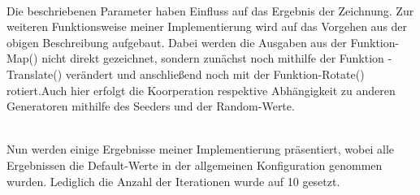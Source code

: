 \documentclass[../mciAusarbeitung.tex]{subfiles}
\begin{document}
            $~$ \\Die beschriebenen Parameter haben Einfluss auf das Ergebnis der Zeichnung. Zur weiteren Funktionsweise meiner Implementierung wird auf das Vorgehen aus der obigen Beschreibung aufgebaut. Dabei werden die Ausgaben aus der Funktion-Map() nicht direkt gezeichnet, sondern zunächst noch mithilfe der Funktion -Translate() verändert und anschließend noch mit der Funktion-Rotate() rotiert.Auch hier erfolgt die Koorperation respektive Abhängigkeit zu anderen Generatoren mithilfe des Seeders und der Random-Werte.
            
            $~$ \\Nun werden einige Ergebnisse meiner Implementierung präsentiert, wobei alle Ergebnissen die Default-Werte in der allgemeinen Konfiguration genommen wurden. Lediglich die Anzahl der Iterationen wurde auf 10 gesetzt.
 
\end{document}

